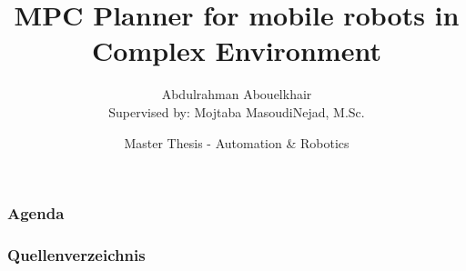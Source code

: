 \documentclass[aspectratio=1610, professionalfonts, 9pt]{beamer}
\title[MPC-Planner]{MPC Planner for mobile robots in Complex Environment}
\author[A.~Abouelkhair]{Abdulrahman Abouelkhair\\ Supervised by: Mojtaba MasoudiNejad, M.Sc.}
\institute[FLW]{\small Lehrstuhl für Förder- und Lagerwesen \\  Fakultät Maschinenbau}
\date[SoSe 2019]{Master Thesis - Automation \& Robotics}
\begin{document}
\maketitle

\begin{frame}
    \frametitle{Agenda}
    \tableofcontents
\end{frame}














% 

\begin{frame}[allowframebreaks]
        \frametitle{Quellenverzeichnis}
        \printbibliography
\end{frame}
\end{document}
